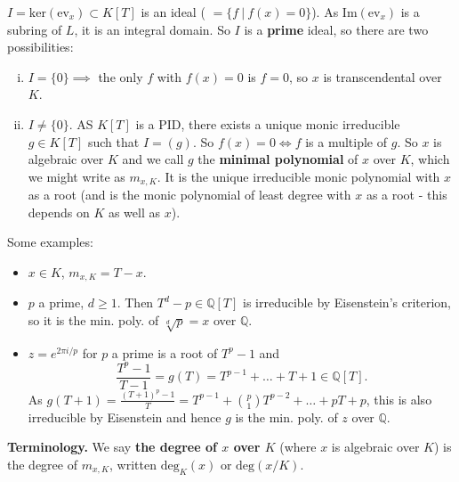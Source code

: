 \documentclass{article}
\theoremstyle{definition}
\begin{document}
$I = \text{ker}(\text{ev}_x) \subset K[T]$ is an ideal ( $= \{f ~|~ f(x)=0\}$). As $\text{Im}(\text{ev}_x)$ is a subring of $L$, it is an integral domain. So $I$ is a \textbf{prime} ideal, so there are two possibilities:
\begin{enumerate}[(i)]
    \item $I = \{0\} \implies $ the only $f$ with $f(x)=0$ is $f=0$, so $x$ is transcendental over $K$.
    \item $I \neq \{0\}$. AS $K[T]$ is a PID, there exists a unique monic irreducible $g \in K[T]$ such that $I = (g)$. So $f(x) = 0 \iff f$ is a multiple of $g$. So $x$ is algebraic over $K$ and we call $g$ the \textbf{minimal polynomial} of $x$ over $K$, which we might write as $m_{x,K}$. It is the unique irreducible monic polynomial with $x$ as a root (and is the monic polynomial of least degree with $x$ as a root - this depends on $K$ as well as $x$). 
\end{enumerate}
Some examples:
\begin{itemize}
    \item $x \in K$, $m_{x,K} = T-x$.
    \item $p$ a prime, $d \ge 1$. Then $T^d - p \in \mathbb{Q}[T]$ is irreducible by Eisenstein's criterion, so it is the min. poly. of $\sqrt[d]{p} = x$ over $\mathbb{Q}$.
    \item $z = e^{2 \pi i/p}$ for $p$ a prime is a root of $T^p - 1$ and $$\frac{T^p-1}{T-1} = g(T) = T^{p-1} + \ldots + T + 1 \in \mathbb{Q}[T].$$
    As $g(T+1) = \frac{(T+1)^p - 1}{T} = T^{p-1} + {{p} \choose {1}} T^{p-2} + \ldots + pT + p$, this is also irreducible by Eisenstein and hence $g$ is the min. poly. of $z$ over $\mathbb{Q}$.
\end{itemize}
\textbf{Terminology.} We say \textbf{the degree of $x$ over $K$} (where $x$ is algebraic over $K$) is the degree of $m_{x,K}$, written $\text{deg}_K(x)$ or $\text{deg}(x/K)$.
\vspace{1mm}
\end{document}
